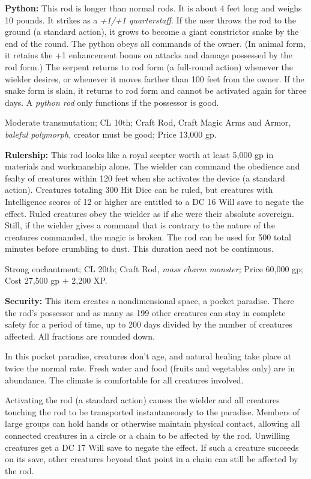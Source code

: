 \textbf{Python: }This rod is longer than normal rods. It is about 4 feet long and 
weighs 10 pounds. It strikes as a \textit{+1/+1 quarterstaff}. If the user throws 
the rod to the ground (a standard action), it grows to become a giant constrictor 
snake by the end of the round. The python obeys all commands of the owner. (In 
animal form, it retains the +1 enhancement bonus on attacks and damage possessed 
by the rod form.) The serpent returns to rod form (a full-round action) whenever 
the wielder desires, or whenever it moves farther than 100 feet from the owner. 
If the snake form is slain, it returns to rod form and cannot be activated again 
for three days. A \textit{python rod }only functions if the possessor is good.

Moderate transmutation; CL 10th; Craft Rod, Craft Magic Arms and Armor, \textit{baleful 
polymorph, }creator must be good; Price 13,000 gp.

\textbf{Rulership:} This rod looks like a royal scepter worth at least 5,000 gp 
in materials and workmanship alone. The wielder can command the obedience and fealty 
of creatures within 120 feet when she activates the device (a standard action). 
Creatures totaling 300 Hit Dice can be ruled, but creatures with Intelligence scores 
of 12 or higher are entitled to a DC 16 Will save to negate the effect. Ruled creatures 
obey the wielder as if she were their absolute sovereign. Still, if the wielder 
gives a command that is contrary to the nature of the creatures commanded, the 
magic is broken. The rod can be used for 500 total minutes before crumbling to 
dust. This duration need not be continuous.

Strong enchantment; CL 20th; Craft Rod, \textit{mass charm monster; }Price 60,000 
gp; Cost 27,500 gp + 2,200 XP.

\textbf{Security: }This item creates a nondimensional space, a pocket paradise. 
There the rod's possessor and as many as 199 other creatures can stay in complete 
safety for a period of time, up to 200 days divided by the number of creatures 
affected. All fractions are rounded down.

In this pocket paradise, creatures don't age, and natural healing take place at 
twice the normal rate. Fresh water and food (fruits and vegetables only) are in 
abundance. The climate is comfortable for all creatures involved.

Activating the rod (a standard action) causes the wielder and all creatures touching 
the rod to be transported instantaneously to the paradise. Members of large groups 
can hold hands or otherwise maintain physical contact, allowing all connected creatures 
in a circle or a chain to be affected by the rod. Unwilling creatures get a DC 
17 Will save to negate the effect. If such a creature succeeds on its save, other 
creatures beyond that point in a chain can still be affected by the rod.

